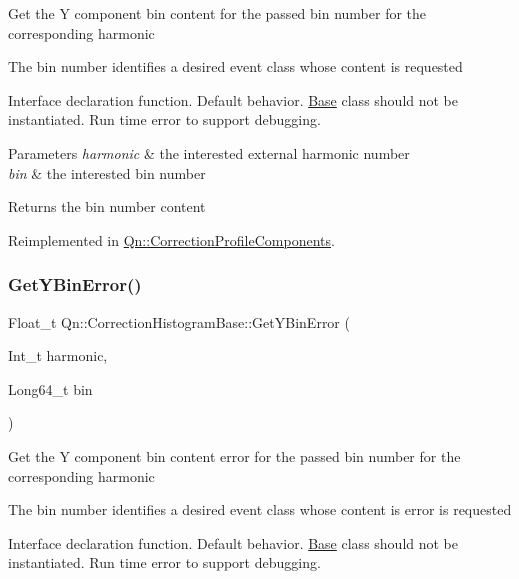 Get the Y component bin content for the passed bin number for the corresponding harmonic

The bin number identifies a desired event class whose content is requested

Interface declaration function. Default behavior. \mbox{\hyperlink{classBase}{Base}} class should not be instantiated. Run time error to support debugging.


\begin{DoxyParams}{Parameters}
{\em harmonic} & the interested external harmonic number \\
\hline
{\em bin} & the interested bin number \\
\hline
\end{DoxyParams}
\begin{DoxyReturn}{Returns}
the bin number content 
\end{DoxyReturn}


Reimplemented in \mbox{\hyperlink{classQn_1_1CorrectionProfileComponents_aba7aebf07e0a7add371da1d53101b64a}{Qn\+::\+Correction\+Profile\+Components}}.

\mbox{\label{classQn_1_1CorrectionHistogramBase_ad9b6bbde5fc1d8b5c282d33bd1bc50b4}} 
\subsubsection{\texorpdfstring{Get\+Y\+Bin\+Error()}{GetYBinError()}}
{\footnotesize\ttfamily Float\+\_\+t Qn\+::\+Correction\+Histogram\+Base\+::\+Get\+Y\+Bin\+Error (\begin{DoxyParamCaption}\item[{Int\+\_\+t}]{harmonic,  }\item[{Long64\+\_\+t}]{bin }\end{DoxyParamCaption})\hspace{0.3cm}{\ttfamily [virtual]}}

Get the Y component bin content error for the passed bin number for the corresponding harmonic

The bin number identifies a desired event class whose content is error is requested

Interface declaration function. Default behavior. \mbox{\hyperlink{classBase}{Base}} class should not be instantiated. Run time error to support debugging.


